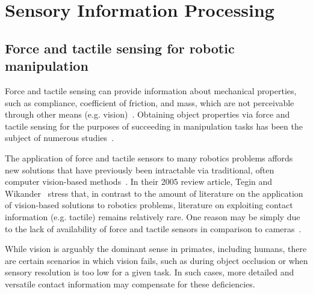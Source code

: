 \section{Sensory Information Processing}


\subsection{Force and tactile sensing for robotic manipulation}


Force and tactile sensing can provide information about mechanical properties, such as compliance, coefficient of friction, and mass, which are not perceivable through other means (e.g. vision)~\cite{howe1993tactile}.
Obtaining object properties via force and tactile sensing for the purposes of succeeding in manipulation tasks has been the subject of numerous studies~\cite{Heidemann2004, Detry2011, lepora2012embodied}.

The application of force and tactile sensors to many robotics problems affords new solutions that have previously been intractable via traditional, often computer vision-based methods~\cite{lee1999review}.
In their 2005 review article, Tegin and Wikander~\cite{tegin2005tactile} stress that, in contrast to the amount of literature on the application of vision-based solutions to robotics problems, literature on exploiting contact information (e.g. tactile) remains relatively rare.
One reason may be simply due to the lack of availability of force and tactile sensors in comparison to cameras~\cite{howe1993tactile}.

While vision is arguably the dominant sense in primates, including humans, there are certain scenarios in which vision fails, such as during object occlusion or when sensory resolution is too low for a given task.
In such cases, more detailed and versatile contact information may compensate for these deficiencies.

